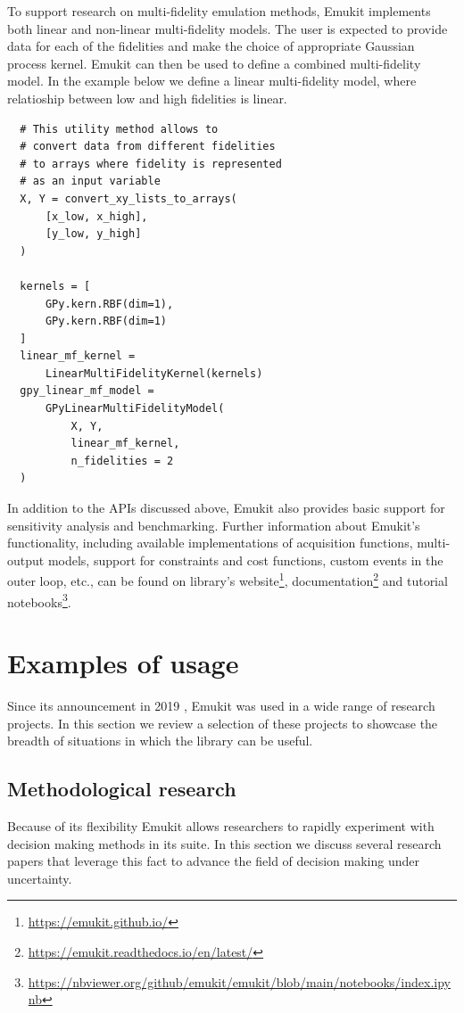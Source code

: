 To support research on multi-fidelity emulation methods, Emukit implements both linear and non-linear multi-fidelity models. The user is expected to provide data for each of the fidelities and make the choice of appropriate Gaussian process kernel. Emukit can then be used to define a combined multi-fidelity model. In the example below we define a linear multi-fidelity model, where relatioship between low and high fidelities is linear.

\begin{verbatim}
  # This utility method allows to
  # convert data from different fidelities
  # to arrays where fidelity is represented
  # as an input variable
  X, Y = convert_xy_lists_to_arrays(
      [x_low, x_high],
      [y_low, y_high]
  )

  kernels = [
      GPy.kern.RBF(dim=1),
      GPy.kern.RBF(dim=1)
  ]
  linear_mf_kernel =
      LinearMultiFidelityKernel(kernels)
  gpy_linear_mf_model =
      GPyLinearMultiFidelityModel(
          X, Y,
          linear_mf_kernel,
          n_fidelities = 2
  )
\end{verbatim}

In addition to the APIs discussed above, Emukit also provides basic support for sensitivity analysis and benchmarking. Further information about Emukit's functionality, including available implementations of acquisition functions, multi-output models, support for constraints and cost functions, custom events in the outer loop, etc., can be found on library's website\footnote{\url{https://emukit.github.io/}}, documentation\footnote{\url{https://emukit.readthedocs.io/en/latest/}} and tutorial notebooks\footnote{\url{https://nbviewer.org/github/emukit/emukit/blob/main/notebooks/index.ipynb}}. 


\section{Examples of usage}
Since its announcement in 2019 \cite{paleyes2019emulation}, Emukit was used in a wide range of research projects. In this section we review a selection of these projects to showcase the breadth of situations in which the library can be useful.

\subsection{Methodological research}
Because of its flexibility Emukit allows researchers to rapidly experiment with decision making methods in its suite. In this section we discuss several research papers that leverage this fact to advance the field of decision making under uncertainty.

